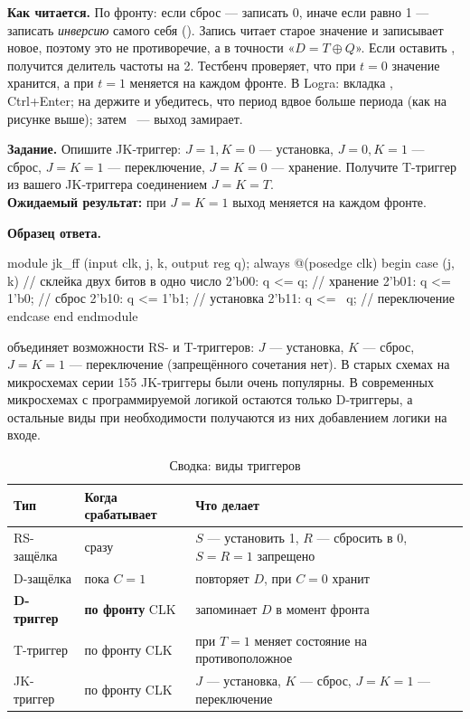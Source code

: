 \textbf{Как читается.} По фронту: если сброс --- записать 0, иначе если
 равно 1 --- записать \emph{инверсию} самого себя ().
Запись  читает старое значение  и записывает новое,
поэтому это не противоречие, а в точности «$D=T\oplus Q$». Если оставить
, получится делитель частоты на 2. Тестбенч 
проверяет, что при $t=0$ значение хранится, а при $t=1$ меняется на каждом
фронте. В Logra: вкладка , Ctrl+Enter; на  держите
 и убедитесь, что период  вдвое больше периода 
(как на рисунке выше); затем ~--- выход замирает.

\begin{diybox}
\textbf{Задание.}  Опишите JK-триггер: $J=1,K=0$ --- установка,
$J=0,K=1$ --- сброс, $J=K=1$ --- переключение, $J=K=0$ --- хранение.
 Получите T-триггер из вашего JK-триггера соединением $J=K=T$.\\
\textbf{Ожидаемый результат:} при $J=K=1$ выход меняется на каждом фронте.
\end{diybox}

\textbf{Образец ответа.}
\begin{vcode}
module jk_ff (input clk, j, k, output reg q);
    always @(posedge clk) begin
        case ({j, k})                 // склейка двух битов в одно число
            2'b00: q <= q;            // хранение
            2'b01: q <= 1'b0;         // сброс
            2'b10: q <= 1'b1;         // установка
            2'b11: q <= ~q;           // переключение
        endcase
    end
endmodule
\end{vcode}

 объединяет возможности RS- и T-триггеров: $J$ ---
установка, $K$ --- сброс, $J = K = 1$ --- переключение (запрещённого сочетания
нет). В старых схемах на микросхемах серии 155 JK-триггеры были очень
популярны. В современных микросхемах с программируемой логикой остаются
только D-триггеры, а остальные виды при необходимости получаются из них
добавлением логики на входе.

\begin{table}[H]
\centering
\caption{Сводка: виды триггеров}
\small
\begin{tabularx}{\textwidth}{l l X}
\toprule
\textbf{Тип} & \textbf{Когда срабатывает} & \textbf{Что делает} \\
\midrule
RS-защёлка & сразу & $S$ --- установить 1, $R$ --- сбросить в 0, $S=R=1$ запрещено \\
D-защёлка  & пока $C = 1$ & повторяет $D$, при $C = 0$ хранит \\
\textbf{D-триггер} & \textbf{по фронту} CLK & запоминает $D$ в момент фронта \\
T-триггер  & по фронту CLK & при $T=1$ меняет состояние на противоположное \\
JK-триггер & по фронту CLK & $J$ --- установка, $K$ --- сброс, $J=K=1$ --- переключение \\
\bottomrule
\end{tabularx}
\end{table}

